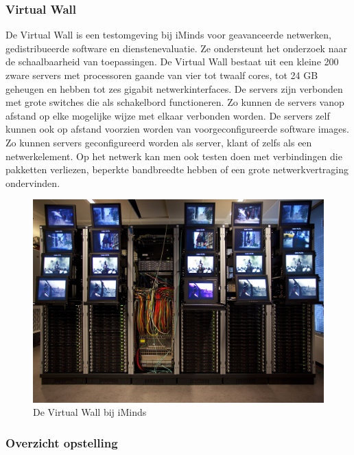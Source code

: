 \subsubsection{Virtual Wall}

De Virtual Wall is een testomgeving bij iMinds voor geavanceerde netwerken, gedistribueerde software en dienstenevaluatie.
Ze ondersteunt het onderzoek naar de schaalbaarheid van toepassingen.
De Virtual Wall bestaat uit een kleine 200 zware servers met processoren gaande van vier tot twaalf cores,
tot 24 GB geheugen en hebben tot zes gigabit netwerkinterfaces.
De servers zijn verbonden met grote switches die als schakelbord functioneren.
Zo kunnen de servers vanop afstand op elke mogelijke wijze met elkaar verbonden worden.
De servers zelf kunnen ook op afstand voorzien worden van voorgeconfigureerde software images.
Zo kunnen servers geconfigureerd worden als server, klant of zelfs als een netwerkelement.
Op het netwerk kan men ook testen doen met verbindingen die pakketten verliezen, beperkte bandbreedte hebben of
een grote netwerkvertraging ondervinden\cite{virtual-wall-uitleg, virtual-wall-specs}.

\begin{figure}[h]
	\centering
	\includegraphics[scale=0.50]{figures/virtual-wall}
	\caption[De Virtual Wall bij iMinds]{De Virtual Wall bij iMinds\cite{virtual-wall-specs}}
	\label{fig-virtual-wall}
\end{figure}

\subsubsection{Overzicht opstelling}

